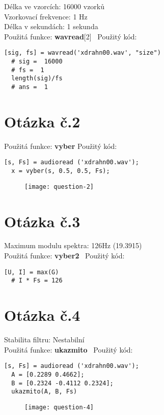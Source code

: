 \documentclass[a4paper,11pt]{article}
\begin{document}
Délka ve vzorcích: 16000 vzorků\\
Vzorkovací frekvence: 1 Hz\\
Délka v sekundách: 1 sekunda\\
\newline
Použitá funkce: \textbf{wavread}[2]\
\newline
\newline
Použitý kód:
\lstset{language=Octave}
\begin{lstlisting}[frame=single,breaklines]
  [sig, fs] = wavread('xdrahn00.wav', "size")
  # sig =  16000
  # fs =  1
  length(sig)/fs
  # ans =  1
\end{lstlisting}

\section{Otázka č.2}

Použitá funkce: \textbf{vyber}
\newline
\newline
Použitý kód:
\lstset{language=Octave}
\begin{lstlisting}[frame=single,breaklines]
  [s, Fs] = audioread ('xdrahn00.wav');
  x = vyber(s, 0.5, 0.5, Fs);
\end{lstlisting}

\begin{figure}[h]
  \centering
  \texttt{[image: question-2]}
\end{figure}

\section{Otázka č.3}

Maximum modulu spektra: 126Hz (19.3915)\\
\newline
Použitá funkce: \textbf{vyber2}\
\newline
\newline
Použitý kód:
\lstset{language=Octave}
\begin{lstlisting}[frame=single,breaklines]
  [U, I] = max(G)
  # I * Fs = 126
\end{lstlisting}

\section{Otázka č.4}

Stabilita filtru: Nestabilní\\
\newline
Použitá funkce: \textbf{ukazmito}\
\newline
\newline
Použitý kód:
\lstset{language=Octave}
\begin{lstlisting}[frame=single,breaklines]
  [s, Fs] = audioread ('xdrahn00.wav');
  A = [0.2289 0.4662];
  B = [0.2324 -0.4112 0.2324];
  ukazmito(A, B, Fs)
\end{lstlisting}

\begin{figure}[h]
  \centering
  \texttt{[image: question-4]}
\end{figure}

\nocite{*}




\newpage
\thispagestyle{empty}

\end{document}

